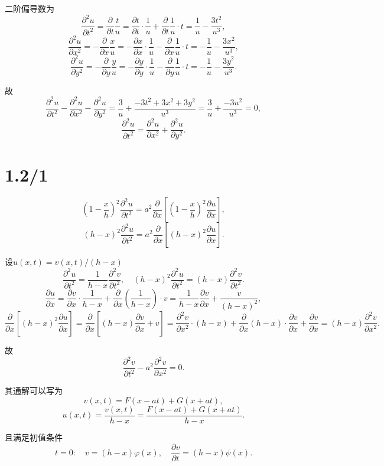 \documentclass[11pt,a4paper]{article}
\begin{document}
二阶偏导数为
$$\frac{\partial^2 u}{\partial t^2}=\frac{\partial}{\partial t}\frac{t}{u}=\frac{\partial t}{\partial t}\cdot \frac{1}{u}+\frac{\partial}{\partial t}\frac{1}{u}\cdot t=\frac{1}{u}-\frac{3t^2}{u^3},$$
$$\frac{\partial^2 u}{\partial x^2}=-\frac{\partial}{\partial x}\frac{x}{u}=-\frac{\partial x}{\partial x}\cdot \frac{1}{u}-\frac{\partial}{\partial x}\frac{1}{u}\cdot t=-\frac{1}{u}-\frac{3x^2}{u^3},$$
$$\frac{\partial^2 u}{\partial y^2}=-\frac{\partial}{\partial y}\frac{y}{u}=-\frac{\partial y}{\partial y}\cdot \frac{1}{u}-\frac{\partial}{\partial y}\frac{1}{u}\cdot t=-\frac{1}{u}-\frac{3y^2}{u^3}.$$

故
$$\frac{\partial^2 u}{\partial t^2}-\frac{\partial^2 u}{\partial x^2}-\frac{\partial^2 u}{\partial y^2}=\frac{3}{u}+\frac{-3t^2+3x^2+3y^2}{u^3}=\frac{3}{u}+\frac{-3u^2}{u^3}=0,$$
$$\frac{\partial^2 u}{\partial t^2}=\frac{\partial^2 u}{\partial x^2}+\frac{\partial^2 u}{\partial y^2}.$$

\section{1.2/1}

$$\left(1-\frac{x}{h}\right)^2\frac{\partial^2 u}{\partial t^2}=a^2\frac{\partial}{\partial x}\left[\left(1-\frac{x}{h}\right)^2\frac{\partial u}{\partial x}\right],$$
$$(h-x)^2\frac{\partial^2 u}{\partial t^2}=a^2\frac{\partial}{\partial x}\left[(h-x)^2\frac{\partial u}{\partial x}\right].$$

设$u(x,t)=v(x,t)/(h-x)$
$$\frac{\partial^2 u}{\partial t^2}=\frac{1}{h-x}\frac{\partial^2 v}{\partial t^2},\quad (h-x)^2\frac{\partial^2 u}{\partial t^2}=(h-x)\frac{\partial^2 v}{\partial t^2}.$$
$$\frac{\partial u}{\partial x}=\frac{\partial v}{\partial x}\cdot\frac{1}{h-x}+\frac{\partial}{\partial x}\left(\frac{1}{h-x}\right)\cdot v=\frac{1}{h-x}\frac{\partial v}{\partial x}+\frac{v}{(h-x)^2},$$
$$\frac{\partial}{\partial x}\left[(h-x)^2\frac{\partial u}{\partial x}\right]=\frac{\partial}{\partial x}\left[(h-x)\frac{\partial v}{\partial x}+v\right]=
  \frac{\partial^2 v}{\partial x^2}\cdot(h-x)+\frac{\partial}{\partial x}(h-x)\cdot\frac{\partial v}{\partial x}+\frac{\partial v}{\partial x}=(h-x)\frac{\partial^2 v}{\partial x^2}.$$

故
$$\frac{\partial^2 v}{\partial t^2}-a^2\frac{\partial^2 v}{\partial x^2}=0.$$

其通解可以写为
$$v(x,t)=F(x-at)+G(x+at),$$
$$u(x,t)=\frac{v(x,t)}{h-x}=\frac{F(x-at)+G(x+at)}{h-x}.$$

且满足初值条件
$$t=0:\quad v=(h-x)\varphi(x),\quad \frac{\partial v}{\partial t}=(h-x)\psi(x).$$
\end{document}
